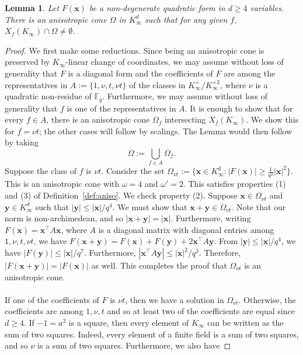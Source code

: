 \documentclass[10pt]{amsart}
\theoremstyle{plain}
\theoremstyle{plain}
\newtheorem{lemma}[theorem]{Lemma}
\renewcommand{\vec}[1]{\mathbf{#1}}
\theoremstyle{remark}
\theoremstyle{definition}
\newcommand{\Ki}{K_\infty}
\begin{document}
\begin{lemma}\label{cone}
Let $F(\vec{x})$ be a non-degenerate quadratic form in $d\geq 4$ variables. There is an anisotropic cone $\Omega$ in $\Ki^d$ such that for any given $f$, $X_f(\Ki)\cap\Omega\neq\emptyset$.
\end{lemma}
\begin{proof}
We first make some reductions. Since being an anisotropic cone is preserved by $\Ki$-linear change of coordinates, we may assume without loss of generality that $F$ is a diagonal form and the coefficients of $F$ are among the representatives in $A:=\{1,\nu,t,\nu t\}$ of the classes in $\Ki^{\times}/\Ki^{\times 2}$, where $\nu$ is a quadratic non-residue of $\mathbb{F}_q$. Furthermore, we may assume without loss of generality that $f$ is one of the representatives in $A$. It is enough to show that for every $f\in A$, there is an anisotropic cone $\Omega_f$ intersecting $X_f(\Ki)$. We show this for $f=\nu t$; the other cases will follow by scalings. The Lemma would then follow by taking 
\[\Omega:=\bigcup_{f\in A}\Omega_f.\]
Suppose the class of $f$ is $\nu t$. Consider the set $\Omega_{\nu t}:=\{\vec{x}\in\Ki^d:|F(\vec{x})|\geq \frac{1}{q^2}|\vec{x}|^2\}$. This is an anisotropic cone with $\omega=4$ and $\omega'=2$. This satisfies properties (1) and (3) of Definition~\ref{def:aniso}. We check property (2). Suppose $\vec{x}\in\Omega_{\nu t}$ and $\vec{y}\in \Ki^d$ such that $|\vec{y}|\leq |\vec{x}|/q^4$. We must show that $\vec{x}+\vec{y}\in\Omega_{\nu t}$. Note that our norm is non-archimedean, and so $|\vec{x}+\vec{y}|=|\vec{x}|$. Furthermore, writing $F(\vec{x})=\vec{x}^{\intercal}A\vec{x}$, where $A$ is a diagonal matrix with diagonal entries among $1,\nu,t,\nu t$, we have $F(\vec{x}+\vec{y})=F(\vec{x})+F(\vec{y})+2\vec{x}^{\intercal}A\vec{y}$. From $|\vec{y}|\leq |\vec{x}|/q^4$, we have $|F(\vec{y})|\leq |\vec{x}|/q^7$. Furthermore, $|\vec{x}^{\intercal}A\vec{y}|\leq |\vec{x}|^2/q^3$. Therefore, $|F(\vec{x}+\vec{y})|=|F(\vec{x})|$ as well. This completes the proof that $\Omega_{\nu t}$ is an anisotropic cone.\\
\\
If one of the coefficients of $F$ is $\nu t$, then we have a solution in $\Omega_{\nu t}$. Otherwise, the coefficients are among $1,\nu,t$ and so at least two of the coefficients are equal since $d\geq 4$. If $-1=a^2$ is a square, then every element of $\Ki$ can be written as the sum of two squares. Indeed, every element of a finite field is a sum of two squares, and so $\nu$ is a sum of two squares. Furthermore, we also have

\end{proof}
\end{document}
